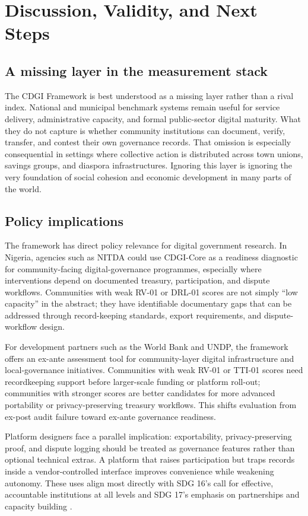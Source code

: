 \documentclass[review,onecolumn]{elsarticle}
\begin{document}
\section{Discussion, Validity, and Next Steps}

\subsection{A missing layer in the measurement stack}

The CDGI Framework is best understood as a missing layer rather than a rival index. National and municipal benchmark systems remain useful for service delivery, administrative capacity, and formal public-sector digital maturity. What they do not capture is whether community institutions can document, verify, transfer, and contest their own governance records. That omission is especially consequential in settings where collective action is distributed across town unions, savings groups, and diaspora infrastructures. Ignoring this layer is ignoring the very foundation of social cohesion and economic development in many parts of the world.

\subsection{Policy implications}

The framework has direct policy relevance for digital government research. In Nigeria, agencies such as NITDA could use CDGI-Core as a readiness diagnostic for community-facing digital-governance programmes, especially where interventions depend on documented treasury, participation, and dispute workflows. Communities with weak RV-01 or DRL-01 scores are not simply ``low capacity'' in the abstract; they have identifiable documentary gaps that can be addressed through record-keeping standards, export requirements, and dispute-workflow design.

For development partners such as the World Bank and UNDP, the framework offers an ex-ante assessment tool for community-layer digital infrastructure and local-governance initiatives. Communities with weak RV-01 or TTI-01 scores need recordkeeping support before larger-scale funding or platform roll-out; communities with stronger scores are better candidates for more advanced portability or privacy-preserving treasury workflows. This shifts evaluation from ex-post audit failure toward ex-ante governance readiness.

Platform designers face a parallel implication: exportability, privacy-preserving proof, and dispute logging should be treated as governance features rather than optional technical extras. A platform that raises participation but traps records inside a vendor-controlled interface improves convenience while weakening autonomy. These uses align most directly with SDG 16's call for effective, accountable institutions at all levels and SDG 17's emphasis on partnerships and capacity building \cite{un2015}.
\end{document}
